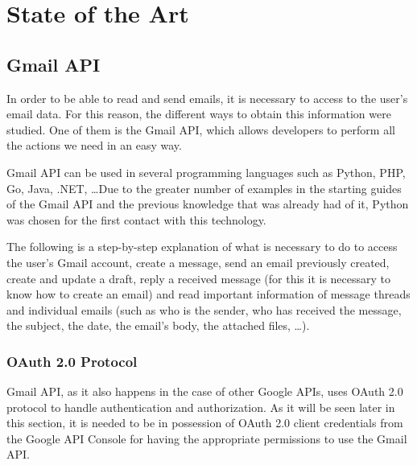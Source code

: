 \chapter{State of the Art}
\label{cap:estadoDeLaCuestion}

\section{Gmail API}\label{sect:gmailapi}
In order to be able to read and send emails, it is necessary to access to the user's email data. For this reason, the different ways to obtain this information were studied. One of them is the Gmail API, which allows developers to perform all the actions we need in an easy way.

Gmail API can be used in several programming languages such as Python, PHP, Go, Java, .NET, \ldots Due to the greater number of examples in the starting guides of the Gmail API \citep{gmailAPI} and the previous knowledge that was already had of it, Python was chosen for the first contact with this technology.

The following is a step-by-step explanation of what is necessary to do to access the user's Gmail account, create a message, send an email previously created, create and update a draft, reply a received message (for this it is necessary to know how to create an email) and read important information of message threads and individual emails (such as who is the sender, who has received the message, the subject, the date, the email's body, the attached files, \ldots).

\subsection{OAuth 2.0 Protocol}\label{ssect:oauth}
Gmail API, as it also happens in the case of other Google APIs, uses OAuth 2.0 protocol \citep{oauth} to handle authentication and authorization. As it will be seen later in this section, it is needed to be in possession of OAuth 2.0 client credentials from the Google API Console for having the appropriate permissions to use the Gmail API.

